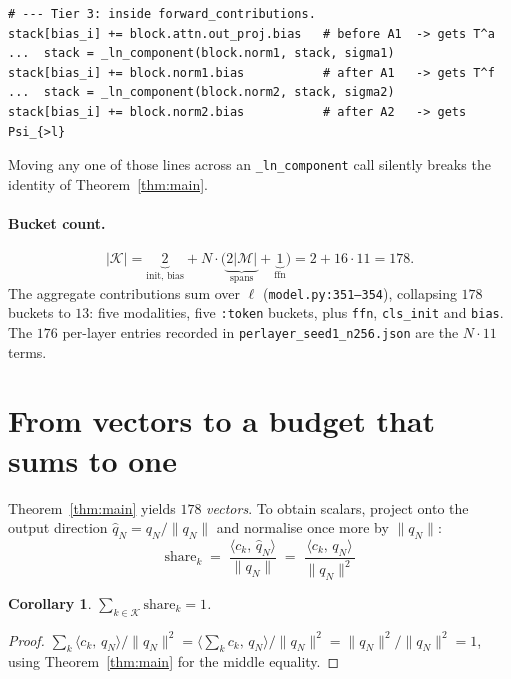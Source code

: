 \documentclass[11pt]{article}
\theoremstyle{plain}
\newtheorem{corollary}{Corollary}
\theoremstyle{remark}
\newcommand{\Mset}{\mathcal{M}}
\newcommand{\Kset}{\mathcal{K}}
\newcommand{\ip}[2]{\langle #1,\, #2\rangle}
\newcommand{\norm}[1]{\lVert #1 \rVert}
\newcommand{\code}[1]{\texttt{\small #1}}
\begin{document}
\begin{lstlisting}
# --- Tier 3: inside forward_contributions.
stack[bias_i] += block.attn.out_proj.bias   # before A1  -> gets T^a
...  stack = _ln_component(block.norm1, stack, sigma1)
stack[bias_i] += block.norm1.bias           # after A1   -> gets T^f
...  stack = _ln_component(block.norm2, stack, sigma2)
stack[bias_i] += block.norm2.bias           # after A2   -> gets Psi_{>l}
\end{lstlisting}

\noindent
Moving any one of those lines across an \code{\_ln\_component} call silently
breaks the identity of Theorem~\ref{thm:main}.

\paragraph{Bucket count.}
\[
  \lvert\Kset\rvert
  = \underbrace{2}_{\text{init, bias}}
  + N\cdot\big(\underbrace{2\lvert\Mset\rvert}_{\text{spans}}
             + \underbrace{1}_{\text{ffn}}\big)
  = 2 + 16\cdot 11 = 178 .
\]
The aggregate contributions sum over $\ell$ (\code{model.py:351--354}),
collapsing $178$ buckets to $13$: five modalities, five \code{:token} buckets,
plus \code{ffn}, \code{cls\_init} and \code{bias}. The $176$ per-layer entries
recorded in \code{perlayer\_seed1\_n256.json} are the $N\cdot 11$ terms.

\section{From vectors to a budget that sums to one}

Theorem~\ref{thm:main} yields $178$ \emph{vectors}. To obtain scalars, project
onto the output direction $\hat q_N = q_N / \norm{q_N}$ and normalise once more
by $\norm{q_N}$:
\begin{equation}
  \boxed{\;
  \text{share}_k
  \;=\; \frac{\ip{c_k}{\hat q_N}}{\norm{q_N}}
  \;=\; \frac{\ip{c_k}{q_N}}{\norm{q_N}^2}\;}
  \label{eq:share}
\end{equation}

\begin{corollary}
\label{cor:budget}
$\displaystyle\sum_{k\in\Kset}\text{share}_k = 1$.
\end{corollary}

\begin{proof}
$\sum_k \ip{c_k}{q_N} / \norm{q_N}^2
 = \ip{\sum_k c_k}{q_N} / \norm{q_N}^2
 = \norm{q_N}^2 / \norm{q_N}^2 = 1$,
using Theorem~\ref{thm:main} for the middle equality.
\end{proof}
\end{document}
